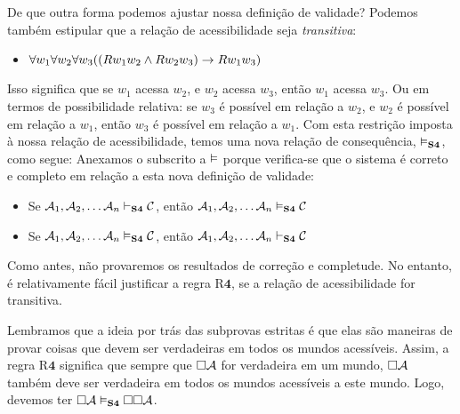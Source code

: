 De que outra forma podemos ajustar nossa definição de validade? Podemos também estipular que a relação de acessibilidade seja \emph{transitiva}:
\begin{itemize}
	\item $\forall w_1\forall w_2\forall w_3 ((Rw_1w_2 \wedge Rw_2w_3)\rightarrow Rw_1w_3)$
\end{itemize}
Isso significa que se  $w_1$ acessa $w_2$, e $w_2$ acessa $w_3$, então  $w_1$ acessa $w_3$. Ou em termos de possibilidade relativa: se $w_3$ é possível em relação a $w_2$, e $w_2$ é possível em relação a  $w_1$, então $w_3$ é possível em relação a  $w_1$. Com esta restrição imposta  à nossa relação de acessibilidade, temos uma nova relação de consequência, $\vDash_{\mathbf{S4}}$, como segue:
Anexamos o subscrito \mlSfour{}  a $\vDash$ porque verifica-se que o sistema \mlSfour{}  é correto e completo em relação a esta nova definição de validade:
\begin{itemize}
	\item Se $\mathcal{A}_1,\mathcal{A}_2, \dots \mathcal{A}_n\vdash_{\mathbf{S4}}\mathcal{C}$, então $\mathcal{A}_1,\mathcal{A}_2, \dots \mathcal{A}_n\vDash_{\mathbf{S4}}\mathcal{C}$
	\item Se $\mathcal{A}_1,\mathcal{A}_2, \dots \mathcal{A}_n\vDash_{\mathbf{S4}}\mathcal{C}$, então $\mathcal{A}_1,\mathcal{A}_2, \dots \mathcal{A}_n\vdash_{\mathbf{S4}}\mathcal{C}$
\end{itemize}
Como antes,  não  provaremos os resultados de correção e completude.  No entanto, é relativamente fácil  justificar a regra   R$\mathbf{4}$,  se a relação de acessibilidade for transitiva.
 
Lembramos que a ideia por trás das subprovas estritas é que elas são maneiras de provar coisas que devem ser verdadeiras em todos os mundos acessíveis. Assim, a regra R$\mathbf{4}$  significa que sempre que $\Box \mathcal{A}$ for verdadeira em um mundo, $\Box \mathcal{A}$ também deve ser verdadeira  em todos os mundos acessíveis  a este mundo. Logo, devemos ter $\Box\mathcal{A} \vDash_{\mathbf{S4}} \Box\Box\mathcal{A}$.

